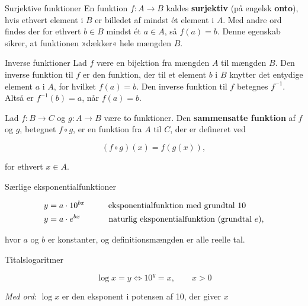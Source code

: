 \begin{definition}{Surjektive funktioner}
En funktion \( f: A \rightarrow B \) kaldes \textbf{surjektiv} (på engelsk \textbf{onto}), hvis ethvert element i \( B \) er billedet af mindst ét element i \( A \). Med andre ord findes der for ethvert \( b \in B \) mindst ét \( a \in A \), så \( f(a) = b \). Denne egenskab sikrer, at funktionen »dækker« hele mængden \( B \).
\end{definition}

\begin{definition}{Inverse funktioner}
Lad $f$ være en bijektion fra mængden $A$ til mængden $B$. Den inverse funktion til $f$ er den funktion, der til et element $b$ i $B$ knytter det entydige element $a$ i $A$, for hvilket $f(a)=b$. Den inverse funktion til $f$ betegnes $f^{-1}$. Altså er $f^{-1}(b)=a$, når $f(a)=b$.    
\end{definition}

\begin{definition}
    

Lad \( f: B \rightarrow C \) og \( g: A \rightarrow B \) være to funktioner. Den \textbf{sammensatte funktion} af \( f \) og \( g \), betegnet \( f \circ g \), er en funktion fra \( A \) til \( C \), der er defineret ved

\[
(f \circ g)(x) = f(g(x)),
\]

for ethvert \( x \in A \).

\end{definition}

\begin{definition}{Særlige eksponentialfunktioner}

\begin{align*}
y &= a \cdot 10^{bx} \hspace{1cm} \text{eksponentialfunktion med grundtal 10} \\
y &= a \cdot e^{bx}  \hspace{1.2cm} \text{naturlig eksponentialfunktion (grundtal }e\text{),}
\end{align*}

hvor $a$ og $b$ er konstanter, og definitionsmængden er alle reelle tal.
    
\end{definition}

\begin{definition}{Titalslogaritmer}

\[
\log x=y \iff 10^y=x, \qquad x>0
\]

\textit{Med ord}: $\log x$ er den eksponent i potensen af 10, der giver $x$   
\end{definition}

